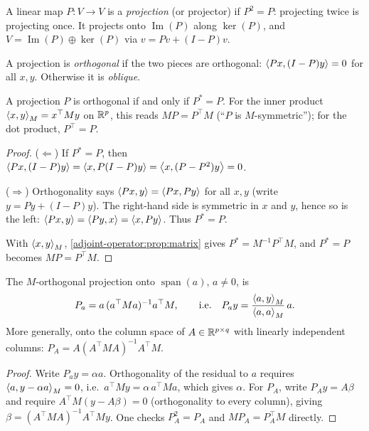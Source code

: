 \begin{notechapter}
\begin{definition}[Projection]
A linear map $P:V\to V$ is a \emph{projection} (or projector) if $P^2 = P$: projecting
twice is projecting once. It projects onto $\operatorname{Im}(P)$ along $\ker(P)$,
and $V = \operatorname{Im}(P)\oplus\ker(P)$ via $v = Pv + (I-P)v$.
\end{definition}

A projection is \emph{orthogonal} if the two pieces are orthogonal:
$\left\langle Px, (I-P)y \right\rangle = 0$ for all $x,y$. Otherwise it is \emph{oblique}.

\begin{proposition}\label{adjoint-operator:prop:orthogonal}
A projection $P$ is orthogonal if and only if $P^* = P$. For the inner product
$\left\langle x, y \right\rangle_M = x^\top My$ on $\mathbb{R}^p$, this reads $MP = P^\top M$ (``$P$ is
$M$-symmetric''); for the dot product, $P^\top = P$.
\end{proposition}

\begin{proof}
($\Leftarrow$) If $P^* = P$, then
$\left\langle Px, (I-P)y \right\rangle = \left\langle x, P(I-P)y \right\rangle = \left\langle x, (P - P^2)y \right\rangle = 0$.

($\Rightarrow$) Orthogonality says $\left\langle Px, y \right\rangle = \left\langle Px, Py \right\rangle$ for all $x,y$
(write $y = Py + (I-P)y$). The right-hand side is symmetric in $x$ and $y$, hence so
is the left: $\left\langle Px, y \right\rangle = \left\langle Py, x \right\rangle = \left\langle x, Py \right\rangle$. Thus $P^* = P$.

With $\left\langle x, y \right\rangle_M$, \cref{adjoint-operator:prop:matrix} gives $P^* = M^{-1}P^\top M$, and
$P^* = P$ becomes $MP = P^\top M$.
\end{proof}

\begin{proposition}\label{adjoint-operator:prop:line}
The $M$-orthogonal projection onto $\operatorname{span}(a)$, $a\neq0$, is
\[
  P_a = a\,(a^\top Ma)^{-1}a^\top M,\qquad\text{i.e.}\quad P_ay = \frac{\left\langle a, y \right\rangle_M}{\left\langle a, a \right\rangle_M}\,a .
\]
More generally, onto the column space of $A\in\mathbb{R}^{p\times q}$ with linearly independent columns:
$P_A = A(A^\top MA)^{-1}A^\top M$.
\end{proposition}

\begin{proof}
Write $P_ay = \alpha a$. Orthogonality of the residual to $a$ requires
$\left\langle a, y - \alpha a \right\rangle_M = 0$, i.e.\ $a^\top My = \alpha\,a^\top Ma$, which gives $\alpha$.
For $P_A$, write $P_Ay = A\beta$ and require $A^\top M(y - A\beta) = 0$ (orthogonality to
every column), giving $\beta = (A^\top MA)^{-1}A^\top My$. One checks $P_A^2 = P_A$ and
$MP_A = P_A^\top M$ directly.
\end{proof}


\end{notechapter}
